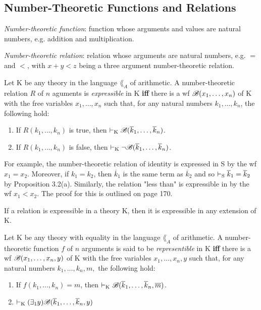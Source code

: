 \subsection{Number-Theoretic Functions and Relations} 

\textit{Number-theoretic function}: function whose arguments and values are natural numbers, e.g. addition and multiplication.

\textit{Number-theoretic relation}: relation whose arguments are natural numbers, e.g. $=$ and $<$, with $x+y<z$ being a three argument number-theoretic relation.

Let K be any theory in the language $\lang_A$ of arithmetic. A number-theoretic relation $R$ of $n$ aguments is \textit{expressible} in K \textbf{iff} there is a wf $\mathscr{B}(x_1, \dots, x_n)$ of K with the free variables $x_1, \dots, x_n$ such that, for any natural numbers $k_1, \dots, k_n$, the following hold:

\begin{enumerate}
    \item If $R(k_1, \dots, k_n)$ is true, then $\vdash_\text{K} \mathscr{B}(\overline{k}_1, \dots, \overline{k}_n)$.
    \item If $R(k_1, \dots, k_n)$ is false, then $\vdash_\text{K} \lnot \mathscr{B}(\overline{k}_1, \dots, \overline{k}_n)$.
\end{enumerate}

For example, the number-theoretic relation of identity is expressed in S by the wf $x_1=x_2$. Moreover, if $k_1=k_2$, then $\overline{k}_1$ is the same term as $\overline{k}_2$ and so $\vdash_\text{S} \overline{k}_1 = \overline{k}_2$ by Proposition 3.2(a). Similarly, the relation "less than" is expressible in by the wf $x_1<x_2$. The proof for this is outlined on page 170.

If a relation is expressible in a theory K, then it is expressible in any extension of K.

Let K be any theory with equality in the language $\lang_A$ of arithmetic. A number-theoretic function $f$ of $n$ arguments is said to be \textit{representible} in K \textbf{iff} there is a wf $\mathscr{B}(x_1, \dots, x_n, y)$ of K with the free variables $x_1, \dots, x_n, y$ such that, for any natural numbers $k_1, \dots, k_n, m,$ the following hold:

\begin{enumerate}
    \item If $f(k_1, \dots, k_n)=m$, then $\vdash_\text{K} \mathscr{B}(\overline{k}_1, \dots, \overline{k}_n, \overline{m})$.
    \item $\vdash_\text{K}(\exists_1 y) \mathscr{B}(\overline{k}_1, \dots, \overline{k}_n, y)$
\end{enumerate}


